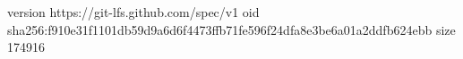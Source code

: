version https://git-lfs.github.com/spec/v1
oid sha256:f910e31f1101db59d9a6d6f4473ffb71fe596f24dfa8e3be6a01a2ddfb624ebb
size 174916
